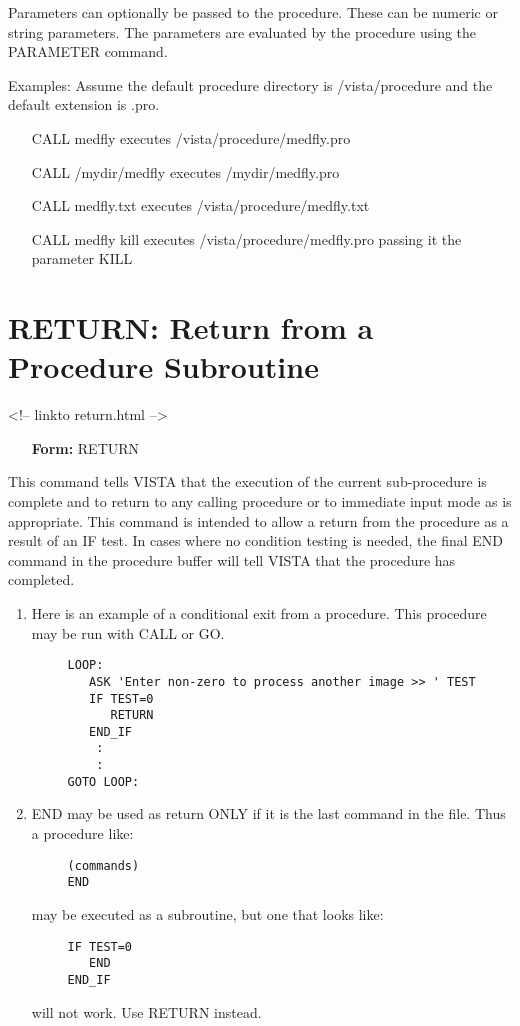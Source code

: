 Parameters can optionally be passed to the procedure.  These can be numeric
or string parameters.  The parameters are evaluated by the procedure using
the PARAMETER command.

Examples:  Assume the default procedure directory is /vista/procedure
and the default extension is .pro.
\begin{itemize}
  \item[CALL medfly\hfill]{executes /vista/procedure/medfly.pro}
  \item[CALL /mydir/medfly\hfill]{executes /mydir/medfly.pro}
  \item[CALL medfly.txt\hfill]{executes /vista/procedure/medfly.txt}
  \item[CALL medfly kill\hfill]{executes /vista/procedure/medfly.pro
passing it the parameter KILL}
\end{itemize}

\section{RETURN: Return from a Procedure Subroutine}
\begin{rawhtml}
<!-- linkto return.html -->
\end{rawhtml}

\begin{itemize}
  \item[\textbf{Form: } RETURN\hfill]{}
\end{itemize}

This command tells VISTA that the execution of the current sub-procedure is
complete and to return to any calling procedure or to immediate input mode
as is appropriate.  This command is intended to allow a return from the
procedure as a result of an IF test. In cases where no condition testing is
needed, the final END command in the procedure buffer will tell VISTA that
the procedure has completed.

\begin{enumerate}
  \item{Here is an example of a conditional exit from a procedure.
   This procedure may be run with CALL or GO.
  \begin{verbatim}
     LOOP:
        ASK 'Enter non-zero to process another image >> ' TEST
        IF TEST=0
           RETURN
        END_IF
         :
         :
     GOTO LOOP:
  \end{verbatim}
  }
  \item{END may be used as return ONLY if it is the last command in 
  the file. Thus a procedure like:
  \begin{verbatim}
     (commands)
     END
  \end{verbatim}
  may be executed as a subroutine, but one that looks like:
  \begin{verbatim}
     IF TEST=0
        END
     END_IF
  \end{verbatim}
  will not work.  Use RETURN instead.
}
\end{enumerate}

